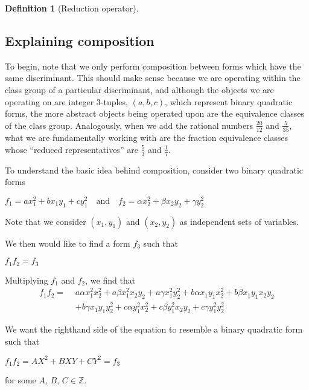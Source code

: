 \documentclass{article}
\theoremstyle{definition}
\newtheorem{definition}{Definition}[section]
\theoremstyle{theorem}
\theoremstyle{example}
\theoremstyle{corollary}
\begin{document}
\begin{definition}[Reduction operator]
\bigskip

\subsection{Explaining composition}

\bigskip

To begin, note that we only perform composition between forms which have the same discriminant. This should make sense because we are operating within the class group of a particular discriminant, and although the objects we are operating on are integer 3-tuples, \((a, b, c)\), which represent binary quadratic forms, the more abstract objects being operated upon are the equivalence classes of the class group. Analogously, when we add the rational numbers \(\frac{20}{12}\) and \(\frac{5}{35}\), what we are fundamentally working with are the fraction equivalence classes whose ``reduced representatives'' are \(\frac{5}{3}\) and \(\frac{1}{7}\).

\bigskip

To understand the basic idea behind composition, consider two binary quadratic forms
\begin{center}
\(f_{1} = a x_{1}^{2} + b x_{1} y_{1} + c y_{1}^{2} \quad \textrm{and} \quad f_{2} = \alpha x_{2}^{2} + \beta x_{2} y_{2} + \gamma y_{2}^{2}\)
\end{center}

\bigskip

Note that we consider \((x_{1}, y_{1})\) and \((x_{2}, y_{2})\) as independent sets of variables.

\bigskip

We then would like to find a form \(f_{3}\) such that
\begin{center}
\(f_{1} f_{2} = f_{3}\)
\end{center}

\bigskip

Multiplying \(f_{1}\) and \(f_{2}\), we find that
\begin{align*}
f_{1} f_{2} = \, \, & a \alpha x_{1}^{2} x_{2}^{2} + a \beta x_{1}^{2} x_{2} y_{2} + a \gamma x_{1}^{2} y_{2}^{2} + b \alpha x_{1} y_{1} x_{2}^{2} + b \beta x_{1} y_{1} x_{2} y_{2} \\
&+ b \gamma x_{1} y_{1} y_{2}^{2} + c \alpha y_{1}^{2} x_{2}^{2} + c \beta y_{1}^{2} x_{2} y_{2} + c \gamma y_{1}^{2} y_{2}^{2}
\end{align*}

\bigskip

We want the righthand side of the equation to resemble a binary quadratic form such that
\begin{center}
\(f_{1} f_{2} = A X^{2} + B X Y + C Y^{2} = f_{3}\)
\end{center}
for some \(A\), \(B\), \(C \in \mathbb{Z}\).


\end{definition}
\end{document}

